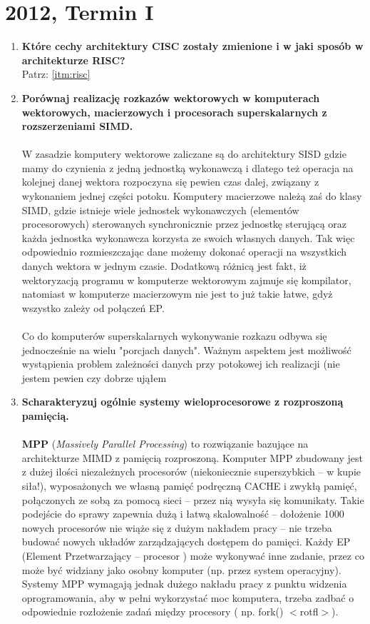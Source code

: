 	\section{2012, Termin I}
		\begin{enumerate}
			\item \textbf{Które cechy architektury CISC zostały zmienione i w jaki sposób w architekturze RISC?}\\
			Patrz: \ref{itm:risc}
			\item \textbf{Porównaj realizację rozkazów wektorowych w komputerach wektorowych, macierzowych i procesorach superskalarnych z rozszerzeniami SIMD.}\\\\
			W zasadzie komputery wektorowe zaliczane są do architektury SISD gdzie mamy do
			czynienia z jedną jednostką wykonawczą i dlatego też operacja na kolejnej danej wektora
			rozpoczyna się pewien czas dalej, związany z wykonaniem jednej części potoku. Komputery
			macierzowe należą zaś do klasy SIMD, gdzie istnieje wiele jednostek wykonawczych
			(elementów procesorowych) sterowanych synchronicznie przez jednostkę sterującą oraz
			każda jednostka wykonawcza korzysta ze swoich własnych danych. Tak więc odpowiednio rozmieszczając dane możemy dokonać operacji na wszystkich danych wektora w jednym
			czasie. Dodatkową różnicą jest fakt, iż wektoryzacją programu w komputerze wektorowym zajmuje
			się kompilator, natomiast w komputerze macierzowym nie jest to już takie łatwe, gdyż
			wszystko zależy od połączeń EP.\\\\
			Co do komputerów superskalarnych wykonywanie rozkazu odbywa się jednocześnie na wielu "porcjach danych". Ważnym aspektem jest możliwość wystąpienia problem zależności danych przy potokowej ich realizacji (nie jestem pewien czy dobrze ująłem
			\label{itm:wektor}
			
			\item \textbf{Scharakteryzuj ogólnie systemy wieloprocesorowe z rozproszoną pamięcią.}\\\\
			\textbf{MPP} (\emph{Massively Parallel Processing}) to rozwiązanie bazujące na architekturze MIMD z
			pamięcią rozproszoną. Komputer MPP zbudowany jest z dużej ilości niezależnych procesorów
			(niekoniecznie superszybkich – w kupie siła!), wyposażonych we własną pamięć podręczną
			CACHE i zwykłą pamięć, połączonych ze sobą za pomocą sieci – przez nią wysyła się
			komunikaty. Takie podejście do sprawy zapewnia dużą i łatwą skalowalność – dołożenie 1000
			nowych procesorów nie wiąże się z dużym nakładem pracy – nie trzeba budować nowych
			układów zarządzających dostępem do pamięci. Każdy EP (Element Przetwarzający – procesor )
			może wykonywać inne zadanie, przez co może być widziany jako osobny komputer (np. przez
			system operacyjny). Systemy MPP wymagają jednak dużego nakładu pracy z punktu widzenia
			oprogramowania, aby w pełni wykorzystać moc komputera, trzeba zadbać o odpowiednie
			rozłożenie zadań między procesory ( np. fork() $ < $rotfl$ > $).
			

\end{enumerate}

